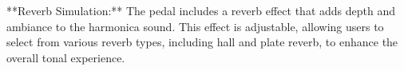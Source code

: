 **Reverb Simulation:**  
The pedal includes a reverb effect that adds depth and ambiance to the harmonica sound. This effect is adjustable, allowing users to select from various reverb types, including hall and plate reverb, to enhance the overall tonal experience.
